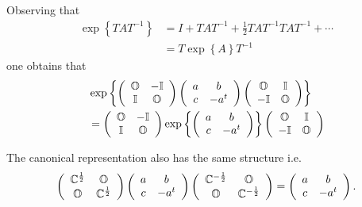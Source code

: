 \documentclass[aps,preprint]{revtex4}%
\begin{document}
Observing that
\begin{align}
\exp\left\{  TAT^{-1}\right\}   &  =I+TAT^{-1}+\frac{1}{2}TAT^{-1}%
TAT^{-1}+\cdots\\
&  =T\exp\left\{  A\right\}  T^{-1}%
\end{align}
one obtains that
\begin{align}
&  \exp\left\{  \left(
\begin{array}
[c]{cc}%
\mathbb{O} & \mathbb{-I}\\
\mathbb{I} & \mathbb{O}%
\end{array}
\right)  \left(
\begin{array}
[c]{cc}%
a & b\\
c & -a^{t}%
\end{array}
\right)  \left(
\begin{array}
[c]{cc}%
\mathbb{O} & \mathbb{I}\\
-\mathbb{I} & \mathbb{O}%
\end{array}
\right)  \right\} \\
&  =\left(
\begin{array}
[c]{cc}%
\mathbb{O} & \mathbb{-I}\\
\mathbb{I} & \mathbb{O}%
\end{array}
\right)  \exp\left\{  \left(
\begin{array}
[c]{cc}%
a & b\\
c & -a^{t}%
\end{array}
\right)  \right\}  \left(
\begin{array}
[c]{cc}%
\mathbb{O} & \mathbb{I}\\
-\mathbb{I} & \mathbb{O}%
\end{array}
\right)
\end{align}


The canonical representation also has the same structure i.e.
\begin{equation}
\left(
\begin{array}
[c]{cc}%
\mathbb{C}^{\frac{1}{2}} & \mathbb{O}\\
\mathbb{O} & \mathbb{C}^{\frac{1}{2}}%
\end{array}
\right)  \left(
\begin{array}
[c]{cc}%
a & b\\
c & -a^{t}%
\end{array}
\right)  \left(
\begin{array}
[c]{cc}%
\mathbb{C}^{-\frac{1}{2}} & \mathbb{O}\\
\mathbb{O} & \mathbb{C}^{-\frac{1}{2}}%
\end{array}
\right)  =\left(
\begin{array}
[c]{cc}%
a & b\\
c & -a^{t}%
\end{array}
\right)  .
\end{equation}
\end{document}
